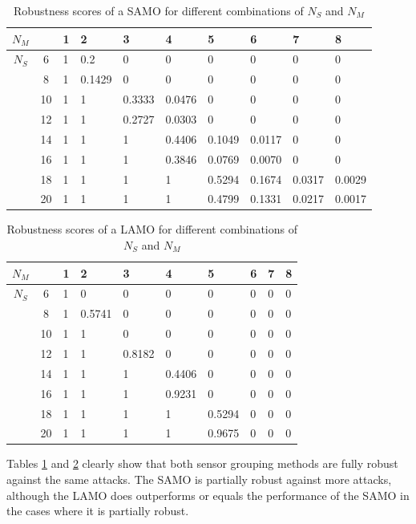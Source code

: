 \begin{table}[H]
    \centering
    \begin{tabular}{|c|c||p{1cm}|p{1cm}|p{1cm}|p{1cm}|p{1cm}|p{1cm}|p{1cm}|p{1cm}|}
    \toprule
        $N_M$ & & 1 & 2 & 3 & 4 & 5 & 6 & 7 & 8 \\
        \midrule
        $N_S$ & 6 & 1 & 0.2 & 0 & 0 & 0 & 0 & 0 & 0 \\
         & 8 & 1 & 0.1429 & 0 & 0 & 0 & 0 & 0 & 0 \\
         & 10 & 1 & 1 & 0.3333 & 0.0476 & 0 & 0 & 0 & 0 \\
         & 12 & 1 & 1 & 0.2727 & 0.0303 & 0 & 0 & 0 & 0 \\
         & 14 & 1 & 1 & 1 & 0.4406 & 0.1049 & 0.0117 & 0 & 0 \\
         & 16 & 1 & 1 & 1 & 0.3846 & 0.0769 & 0.0070 & 0 & 0 \\
         & 18 & 1 & 1 & 1 & 1 & 0.5294 & 0.1674 & 0.0317 & 0.0029 \\
         & 20 & 1 & 1 & 1 & 1 & 0.4799 & 0.1331 & 0.0217 & 0.0017 \\
         \bottomrule
    \end{tabular}
    \caption{Robustness scores of a SAMO for different combinations of $N_S$ and $N_M$}
    \label{tab:SAMO-robustness-score}
\end{table}

\begin{table}[H]
    \centering
    \begin{tabular}{|c|c||p{1cm}|p{1cm}|p{1cm}|p{1cm}|p{1cm}|p{1cm}|p{1cm}|p{1cm}|}
    \toprule
        $N_M$ & & 1 & 2 & 3 & 4 & 5 & 6 & 7 & 8 \\
        \midrule
        $N_S$ & 6 & 1 & 0 & 0 & 0 & 0 & 0 & 0 & 0 \\
         & 8 & 1 & 0.5741 & 0 & 0 & 0 & 0 & 0 & 0 \\
         & 10 & 1 & 1 & 0 & 0 & 0 & 0 & 0 & 0 \\
         & 12 & 1 & 1 & 0.8182 & 0 & 0 & 0 & 0 & 0 \\
         & 14 & 1 & 1 & 1 & 0.4406 & 0 & 0 & 0 & 0 \\
         & 16 & 1 & 1 & 1 & 0.9231 & 0 & 0 & 0 & 0 \\
         & 18 & 1 & 1 & 1 & 1 & 0.5294 & 0 & 0 & 0 \\
         & 20 & 1 & 1 & 1 & 1 & 0.9675 & 0 & 0 & 0 \\
         \bottomrule
    \end{tabular}
    \caption{Robustness scores of a LAMO for different combinations of $N_S$ and $N_M$}
    \label{tab:LAMO-robustness-score}
\end{table}
Tables \ref{tab:SAMO-robustness-score} and \ref{tab:LAMO-robustness-score} clearly show that both sensor grouping methods are fully robust against the same attacks. The SAMO is partially robust against more attacks, although the LAMO does outperforms or equals the performance of the SAMO in the cases where it is partially robust.

